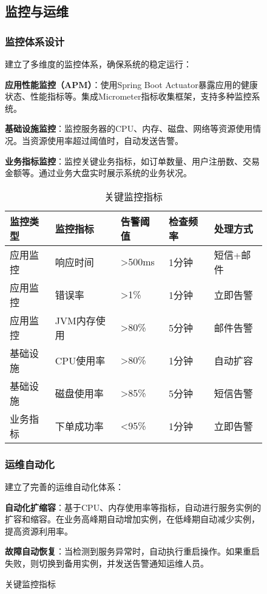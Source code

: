 \documentclass[a4paper,12pt]{article}
\begin{document}
\begin{figure}[H]
\subsection{监控与运维}

\subsubsection{监控体系设计}

建立了多维度的监控体系，确保系统的稳定运行：

\textbf{应用性能监控（APM）}：使用Spring Boot Actuator暴露应用的健康状态、性能指标等。集成Micrometer指标收集框架，支持多种监控系统。

\textbf{基础设施监控}：监控服务器的CPU、内存、磁盘、网络等资源使用情况。当资源使用率超过阈值时，自动发送告警。

\textbf{业务指标监控}：监控关键业务指标，如订单数量、用户注册数、交易金额等。通过业务大盘实时展示系统的业务状况。

\begin{table}[H]
\centering
\caption{关键监控指标}
\begin{tabular}{|p{3cm}|p{2.5cm}|p{2.5cm}|p{2.5cm}|p{2.5cm}|}
\hline
\textbf{监控类型} & \textbf{监控指标} & \textbf{告警阈值} & \textbf{检查频率} & \textbf{处理方式} \\
\hline
应用监控 & 响应时间 & >500ms & 1分钟 & 短信+邮件 \\
\hline
应用监控 & 错误率 & >1\% & 1分钟 & 立即告警 \\
\hline
应用监控 & JVM内存使用 & >80\% & 5分钟 & 邮件告警 \\
\hline
基础设施 & CPU使用率 & >80\% & 1分钟 & 自动扩容 \\
\hline
基础设施 & 磁盘使用率 & >85\% & 5分钟 & 短信告警 \\
\hline
业务指标 & 下单成功率 & <95\% & 1分钟 & 立即告警 \\
\hline
\end{tabular}
\end{table}

\subsubsection{运维自动化}

建立了完善的运维自动化体系：

\textbf{自动化扩缩容}：基于CPU、内存使用率等指标，自动进行服务实例的扩容和缩容。在业务高峰期自动增加实例，在低峰期自动减少实例，提高资源利用率。

\textbf{故障自动恢复}：当检测到服务异常时，自动执行重启操作。如果重启失败，则切换到备用实例，并发送告警通知运维人员。


\end{figure}
\end{document}
